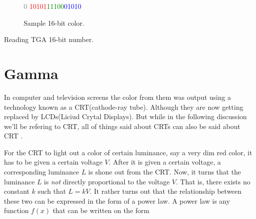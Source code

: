 \begin{figure}
  \centering
  {\huge\textcolor{gray}{0}%
    \textcolor{red}{10101}\textcolor{green}{11100}\textcolor{blue}{01010}}
  \caption{Sample 16-bit color.}
  \label{fig:tga-16-bit-colors-bits}
\end{figure}


\begin{algorithm}[H]
  \caption{Reading TGA 16-bit number.}
  \label{alg:read-16-bit-rgb}
  \begin{algorithmic}[1]
  \end{algorithmic}
\end{algorithm}

\section{Gamma}

\cite{roelofs99:_png}
\cite{boutel:_png_portab_networ_graph_specif_version11}
\cite{boutel:_png_portab_networ_graph_specif_version1}
\cite{boutel:_png_portab_networ_graph_specif_version12}
\cite{Pascale2003_ReviewRGBColourSpaces}
\cite{srgb}

\cite{lilley:_not_just_decor}

\cite{motta1991analytical_crt}

\cite{poynton2003digital}

In computer and television screens the color from them was output
using a technology known as a CRT(cathode-ray tube). Although they are
now getting replaced by LCDs(Liciud Crytal Displays). But while in the
following discussion we'll be refering to CRT, all of things said
about CRTs can also be said about CRT
\cite{hearn1997computer_graphics,roelofs99:_png}.

For the CRT to light out a color of certain luminance, say a very dim
red color, it has to be given a certain voltage $V$. After it is given
a certain voltage, a corresponding luminance $L$ is shone out from the
CRT. Now, it turns that the luminance $L$ is \textit{not} directly
proportional to the voltage $V$. That is, there exists no constant $k$
such that $L = kV$. It rather turns out that the relationship between
these two can be expressed in the form of a power law. A power law is
any function $f(x)$ that can be written on the form

